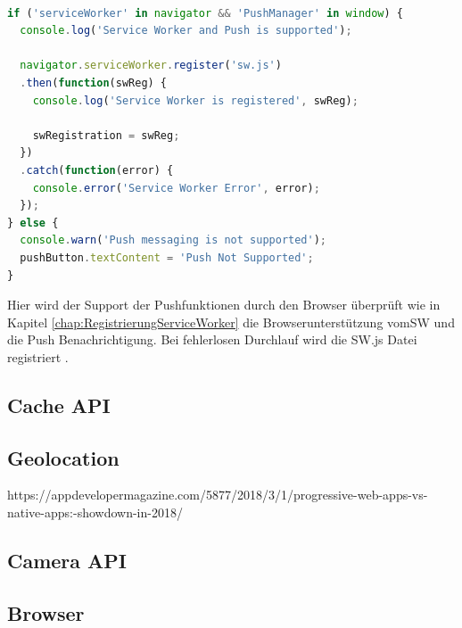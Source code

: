 \begin{lstlisting}[language=JavaScript, caption={Push Notifications},label=lst:PushNotifikation, xleftmargin=50pt]

if ('serviceWorker' in navigator && 'PushManager' in window) {
  console.log('Service Worker and Push is supported');

  navigator.serviceWorker.register('sw.js')
  .then(function(swReg) {
    console.log('Service Worker is registered', swReg);

    swRegistration = swReg;
  })
  .catch(function(error) {
    console.error('Service Worker Error', error);
  });
} else {
  console.warn('Push messaging is not supported');
  pushButton.textContent = 'Push Not Supported';
}
\end{lstlisting}


Hier wird der Support der Pushfunktionen durch den Browser überprüft wie in Kapitel \ref{chap:RegistrierungServiceWorker} die Browserunterstützung vom\acs{SW} und die Push Benachrichtigung. Bei fehlerlosen Durchlauf wird die \acs{SW}.js Datei registriert \cite{PushNotifikation}.

\newpage
\subsection{Cache API}

\subsection{Geolocation}
https://appdevelopermagazine.com/5877/2018/3/1/progressive-web-apps-vs-native-apps:-showdown-in-2018/


\subsection{Camera API}


\subsection{Browser} 





\newpage